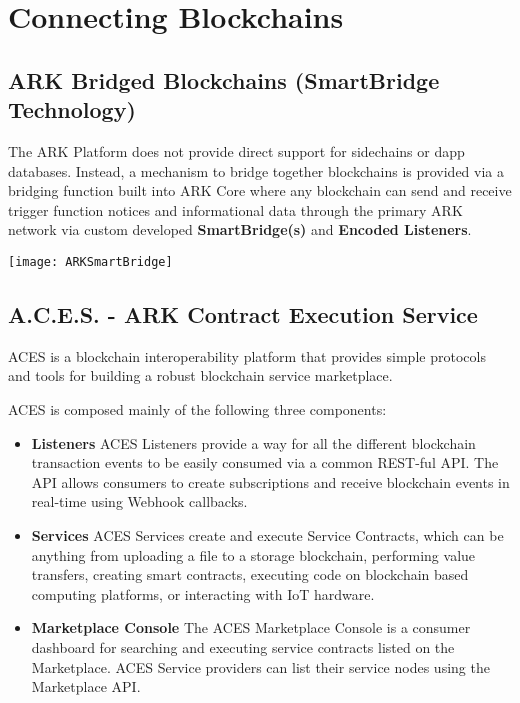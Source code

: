 \documentclass[11pt,fleqn]{book} %
\begin{document}
\section{Connecting Blockchains}
\subsection{ARK Bridged Blockchains (SmartBridge Technology)}
The ARK Platform does not provide direct support for sidechains or dapp databases.
Instead, a mechanism to bridge together blockchains is provided via a bridging
function built into ARK Core where any blockchain can send and receive trigger
function notices and informational data through the primary ARK network via
custom developed \textbf{SmartBridge(s)} and \textbf{Encoded Listeners}.
\begin{center}
	\texttt{[image: ARKSmartBridge]}
\end{center}

\subsection{A.C.E.S. - ARK Contract Execution Service}
ACES is a blockchain interoperability platform that provides simple protocols and tools for building a robust blockchain 
service marketplace.

ACES is composed mainly of the following three components:
\begin{itemize}
	\item \textbf{Listeners} ACES Listeners provide a way for all the different blockchain transaction events to be easily 
	consumed via a common REST-ful API. The API allows consumers to create subscriptions and receive blockchain events 
	in real-time using Webhook callbacks.
	\item \textbf{Services} ACES Services create and execute Service Contracts, which can be anything from uploading 
	a file to a storage blockchain, performing value transfers, creating smart contracts, executing code on 
	blockchain based computing platforms, or interacting with IoT hardware.
	\item \textbf{Marketplace Console} The ACES Marketplace Console is a consumer dashboard for searching and executing 
	service contracts listed on the Marketplace. ACES Service providers can list their service nodes using the Marketplace API.
\end{itemize}
\end{document}
